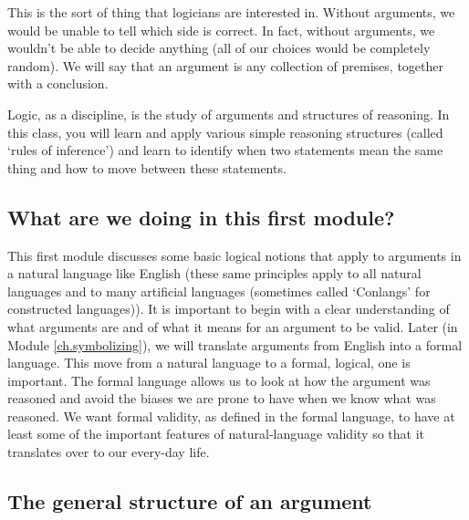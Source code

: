 This is the sort of thing that logicians are interested in.  Without arguments, we would be unable to tell which side is correct. In fact, without arguments, we wouldn't be able to decide anything (all of our choices would be completely random). We will say that an argument is any collection of premises, together with a conclusion. 

Logic, as a discipline, is the study of arguments and structures of reasoning. In this class, you will learn and apply various simple reasoning structures (called ‘rules of inference') and learn to identify when two statements mean the same thing and how to move between these statements.


\subsection{What are we doing in this first module?}

This first module discusses some basic logical notions that apply to arguments in a natural language like English (these same principles apply to all natural languages and to many artificial languages (sometimes called ‘Conlangs' for constructed languages)). It is important to begin with a clear understanding of what arguments are and of what it means for an argument to be valid. Later (in Module \ref{ch.symbolizing}), we will translate arguments from English into a formal language. This move from a natural language to a formal, logical, one is important. The formal language allows us to look at how the argument was reasoned and avoid the biases we are prone to have when we know what was reasoned.  We want formal validity, as defined in the formal language, to have at least some of the important features of natural-language validity so that it translates over to our every-day life.

\subsection{The general structure of an argument}

